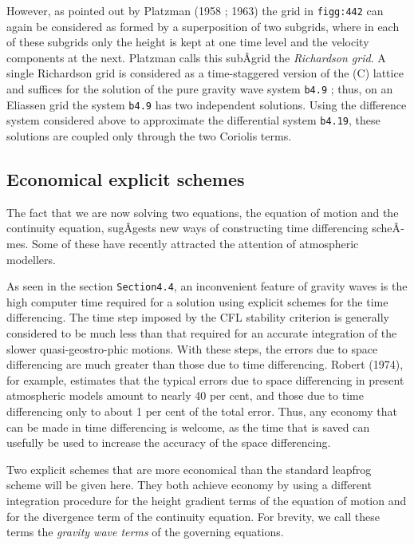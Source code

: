 However, as pointed out by Platzman (1958 ; 1963) the grid in
\texttt{figg:442} can again be considered as formed by a superposition
of two subgrids, where in each of these subgrids only the height is kept
at one time level and the velocity components at the next. Platzman
calls this subÂ­grid the \emph{Richardson grid}. A single Richardson grid
is considered as a time-staggered version of the (C) lattice and
suffices for the solution of the pure gravity wave system \texttt{b4.9}
; thus, on an Eliassen grid the system \texttt{b4.9} has two independent
solutions. Using the difference system considered above to approximate
the differential system \texttt{b4.19}, these solutions are coupled only
through the two Coriolis terms.


\subsection{\texorpdfstring{\textbf{Economical explicit
schemes}}{Economical explicit schemes}}\label{economical-explicit-schemes}

The fact that we are now solving two equations, the equation of motion
and the continuity equation, sugÂ­gests new ways of constructing time
differencing scheÂ­mes. Some of these have recently attracted the
attention of atmospheric modellers.

As seen in the section \texttt{Section4.4}, an inconvenient feature of
gravity waves is the high computer time required for a solution using
explicit schemes for the time differencing. The time step imposed by the
CFL stability criterion is generally considered to be much less than
that required for an accurate integration of the slower
quasi-geostro-phic motions. With these steps, the errors due to space
differencing are much greater than those due to time differencing.
Robert (1974), for example, estimates that the typical errors due to
space differencing in present atmospheric models amount to nearly 40 per
cent, and those due to time differencing only to about 1 per cent of the
total error. Thus, any economy that can be made in time differencing is
welcome, as the time that is saved can usefully be used to increase the
accuracy of the space differencing.

Two explicit schemes that are more economical than the standard leapfrog
scheme will be given here. They both achieve economy by using a
different integration procedure for the height gradient terms of the
equation of motion and for the divergence term of the continuity
equation. For brevity, we call these terms the \emph{gravity wave terms}
of the governing equations.

